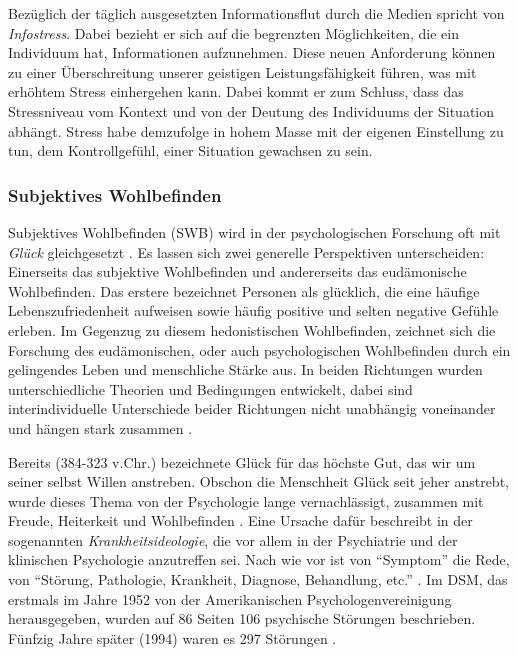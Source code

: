 Bezüglich der täglich ausgesetzten Informationsflut durch die Medien spricht  von \textit{Infostress}. Dabei bezieht er sich auf die begrenzten Möglichkeiten, die ein Individuum hat, Informationen aufzunehmen. Diese neuen Anforderung können zu einer Überschreitung unserer geistigen Leistungsfähigkeit führen, was mit erhöhtem Stress einhergehen kann. Dabei kommt er zum Schluss, dass das Stressniveau vom Kontext und von der Deutung des Individuums der Situation abhängt. Stress habe demzufolge in hohem Masse mit der eigenen Einstellung zu tun, dem Kontrollgefühl, einer Situation gewachsen zu sein.

\subsubsection{Subjektives Wohlbefinden}\label{sec:Swb}
Subjektives Wohlbefinden (SWB) wird in der psychologischen Forschung oft mit \textit{Glück} gleichgesetzt \cite{Eid2014}. Es lassen sich zwei generelle Perspektiven unterscheiden: Einerseits das subjektive Wohlbefinden und andererseits das eudämonische Wohlbefinden. Das erstere bezeichnet Personen als glücklich, die eine häufige Lebenszufriedenheit aufweisen sowie häufig positive und selten negative Gefühle erleben. Im Gegenzug zu diesem hedonistischen Wohlbefinden, zeichnet sich die Forschung des eudämonischen, oder auch psychologischen Wohlbefinden durch ein gelingendes Leben und menschliche Stärke aus. In beiden Richtungen wurden unterschiedliche Theorien und Bedingungen entwickelt, dabei sind interindividuelle Unterschiede beider Richtungen nicht unabhängig voneinander und hängen stark zusammen \cite{Eid2014}.

Bereits  (384-323 v.Chr.) bezeichnete Glück für das höchste Gut, das wir um seiner selbst Willen anstreben. Obschon die Menschheit Glück seit jeher anstrebt, wurde dieses Thema von der Psychologie lange vernachlässigt, zusammen mit Freude, Heiterkeit und Wohlbefinden \cite{Tugade2014, Gruber2014}. Eine Ursache dafür beschreibt  in der sogenannten \textit{Krankheitsideologie}, die vor allem in der Psychiatrie und der klinischen Psychologie anzutreffen sei. Nach wie vor ist von \enquote{Symptom} die Rede, von \enquote{Störung, Pathologie, Krankheit, Diagnose, Behandlung, etc.} \cite[S.~14]{Maddux2005}. Im DSM, das erstmals im Jahre 1952 von der Amerikanischen Psychologenvereinigung herausgegeben, wurden auf 86 Seiten 106 psychische Störungen beschrieben. Fünfzig Jahre später (1994) waren es 297 Störungen \cite{Bucher2009}.

